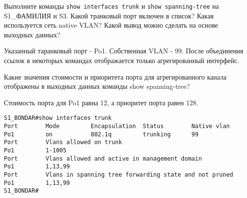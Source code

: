 Выполните команды \verb|show interfaces trunk| и \verb|show spanning-tree|
на S1\_ФАМИЛИЯ и S3.
Какой транковый порт включен в список?
Какая используется сеть native VLAN?
Какой вывод можно сделать на основе выходных данных?

Указанный таранковый порт - Po1.
Собственная VLAN - 99.
После объединения ссылок в некоторых командах отображается только
агрегированный интерфейс.

Какие значения стоимости и приоритета порта
для агрегированного канала отображены
в выходных данных команды show spanning-tree?

Стоимость порта для Po1 равна 12, а приоритет порта равен 128.

\begin{verbatim}
S1_BONDAR#show interfaces trunk
Port        Mode         Encapsulation  Status        Native vlan
Po1         on           802.1q         trunking      99
Port        Vlans allowed on trunk
Po1         1-1005
Port        Vlans allowed and active in management domain
Po1         1,13,99
Port        Vlans in spanning tree forwarding state and not pruned
Po1         1,13,99
S1_BONDAR#
\end{verbatim}

